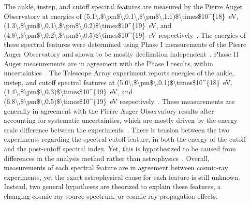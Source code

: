 The ankle, instep, and cutoff spectral features are measured by the Pierre Auger Observatory at energies of \qty[parse-numbers=false]{(5.1\,$\pm$\,0.1\,$\pm$\,1.1)$\times$10^{18}}{\electronvolt}, \qty[parse-numbers=false]{(1.3\,$\pm$\,0.1\,$\pm$\,0.2)$\times$10^{19}}{\electronvolt}, and \qty[parse-numbers=false]{(4.8\,$\pm$\,0.2\,$\pm$\,0.5)$\times$10^{19}}{\electronvolt} respectively~\cite{auger_prl2025_spectrum}.
The energies of these spectral features were determined using Phase I measurements of the Pierre Auger Observatory and shown to be mostly declination independent~\cite{auger_prl2025_spectrum}.
Phase II Auger measurements are in agreement with the Phase I results, within uncertainties~\cite{icrc2025_diego_spectrum}.
The Telescope Array experiment reports energies of the ankle, instep, and cutoff spectral features at \qty[parse-numbers=false]{(5.0\,$\pm$\,0.1)$\times$10^{18}}{\electronvolt}, \qty[parse-numbers=false]{(1.4\,$\pm$\,0.3)$\times$10^{19}}{\electronvolt}, and \qty[parse-numbers=false]{(6.8\,$\pm$\,0.5)$\times$10^{19}}{\electronvolt} respectively~\cite{icrc2025_ta_spectrum}.
These measurements are generally in agreement with the Pierre Auger Observatory results after accounting for systematic uncertainties, which are mostly driven by the energy scale difference between the experiments~\cite{icrc2025_ta_spectrum}.
There is tension between the two experiments regarding the spectral cutoff feature, in both the energy of the cutoff and the post-cutoff spectral index.
Yet, this is hypothesized to be caused from differences in the analysis method rather than astrophysics~\cite{icrc2025_augerta_spectrum}.
Overall, measurements of each spectral feature are in agreement between cosmic-ray experiments, yet the exact astrophysical cause for each feature is still unknown.
Instead, two general hypotheses are theorized to explain these features, a changing cosmic-ray source spectrum, or cosmic-ray propagation effects.





